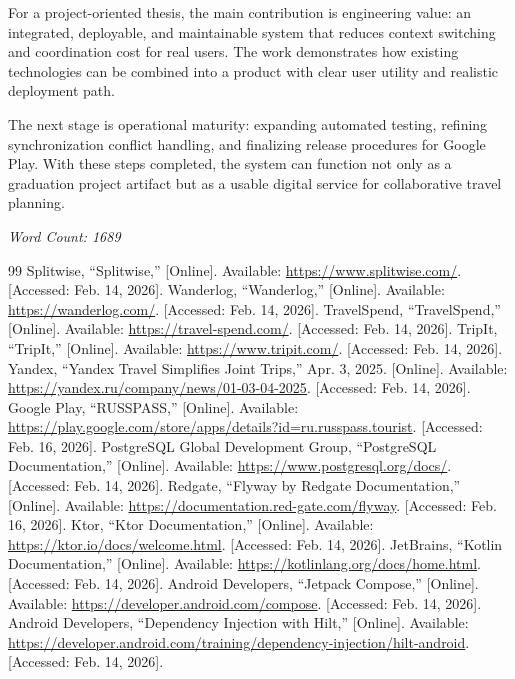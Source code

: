 \documentclass[10pt,twocolumn]{article}
\begin{document}
For a project-oriented thesis, the main contribution is engineering value: an integrated, deployable, and maintainable system that reduces context switching and coordination cost for real users. The work demonstrates how existing technologies can be combined into a product with clear user utility and realistic deployment path.

The next stage is operational maturity: expanding automated testing, refining synchronization conflict handling, and finalizing release procedures for Google Play. With these steps completed, the system can function not only as a graduation project artifact but as a usable digital service for collaborative travel planning.

\textit{Word Count: 1689}

\begin{thebibliography}{99}
Splitwise, ``Splitwise,'' [Online]. Available: \url{https://www.splitwise.com/}. [Accessed: Feb. 14, 2026].
Wanderlog, ``Wanderlog,'' [Online]. Available: \url{https://wanderlog.com/}. [Accessed: Feb. 14, 2026].
TravelSpend, ``TravelSpend,'' [Online]. Available: \url{https://travel-spend.com/}. [Accessed: Feb. 14, 2026].
TripIt, ``TripIt,'' [Online]. Available: \url{https://www.tripit.com/}. [Accessed: Feb. 14, 2026].
Yandex, ``Yandex Travel Simplifies Joint Trips,'' Apr. 3, 2025. [Online]. Available: \url{https://yandex.ru/company/news/01-03-04-2025}. [Accessed: Feb. 14, 2026].
Google Play, ``RUSSPASS,'' [Online]. Available: \url{https://play.google.com/store/apps/details?id=ru.russpass.tourist}. [Accessed: Feb. 16, 2026].
PostgreSQL Global Development Group, ``PostgreSQL Documentation,'' [Online]. Available: \url{https://www.postgresql.org/docs/}. [Accessed: Feb. 14, 2026].
Redgate, ``Flyway by Redgate Documentation,'' [Online]. Available: \url{https://documentation.red-gate.com/flyway}. [Accessed: Feb. 16, 2026].
Ktor, ``Ktor Documentation,'' [Online]. Available: \url{https://ktor.io/docs/welcome.html}. [Accessed: Feb. 14, 2026].
JetBrains, ``Kotlin Documentation,'' [Online]. Available: \url{https://kotlinlang.org/docs/home.html}. [Accessed: Feb. 14, 2026].
Android Developers, ``Jetpack Compose,'' [Online]. Available: \url{https://developer.android.com/compose}. [Accessed: Feb. 14, 2026].
Android Developers, ``Dependency Injection with Hilt,'' [Online]. Available: \url{https://developer.android.com/training/dependency-injection/hilt-android}. [Accessed: Feb. 14, 2026].

\end{thebibliography}
\end{document}

